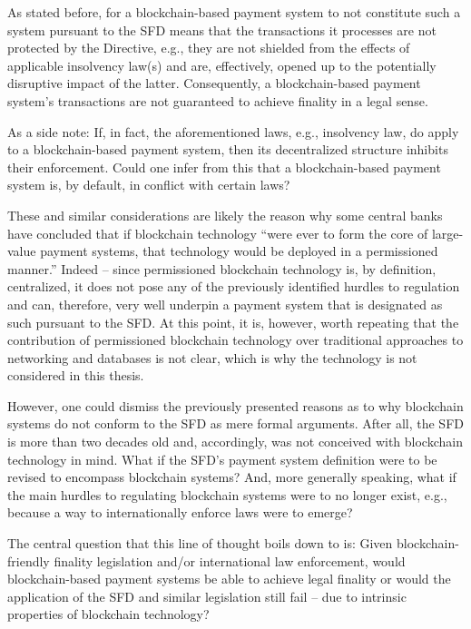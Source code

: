 As stated before, for a blockchain-based payment system to not constitute such a system pursuant to the SFD means that the transactions it processes are not protected by the Directive, e.g., they are not shielded from the effects of applicable insolvency law(s) and are, effectively, opened up to the potentially disruptive impact of the latter.
Consequently, a blockchain-based payment system's transactions are not guaranteed to achieve finality in a legal sense.

As a side note:
If, in fact, the aforementioned laws, e.g., insolvency law, do apply to a blockchain-based payment system, then its decentralized structure inhibits their enforcement. 
Could one infer from this that a blockchain-based payment system is, by default, in conflict with certain laws?

These and similar considerations are likely the reason why some central banks have concluded that if blockchain technology ``were ever to form the core of large-value payment systems, that technology would be deployed in a permissioned manner.'' \autocite{liao2017}
Indeed -- since permissioned blockchain technology is, by definition, centralized, it does not pose any of the previously identified hurdles to regulation and can, therefore, very well underpin a payment system that is designated as such pursuant to the SFD.
At this point, it is, however, worth repeating that the contribution of permissioned blockchain technology over traditional approaches to networking and databases is not clear, which is why the technology is not considered in this thesis.

However, one could dismiss the previously presented reasons as to why blockchain systems do not conform to the SFD as mere formal arguments.
After all, the SFD is more than two decades old and, accordingly, was not conceived with blockchain technology in mind.
What if the SFD's payment system definition were to be revised to encompass blockchain systems?
And, more generally speaking, what if the main hurdles to regulating blockchain systems were to no longer exist, e.g., because a way to internationally enforce laws were to emerge?

The central question that this line of thought boils down to is:
Given blockchain-friendly finality legislation and/or international law enforcement, would blockchain-based payment systems be able to achieve legal finality or would the application of the SFD and similar legislation still fail -- due to intrinsic properties of blockchain technology?

